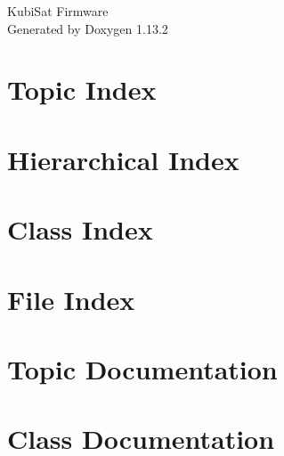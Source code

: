 \documentclass[twoside]{book}
\newcommand{\+}{\discretionary{\mbox{\scriptsize$\hookleftarrow$}}{}{}}
\newcommand{\clearemptydoublepage}{%
    \newpage{\pagestyle{empty}\cleardoublepage}%
  }
\begin{document}
  \raggedbottom
    \hypersetup{pageanchor=false,
                bookmarksnumbered=true,
                pdfencoding=unicode
               }
  \begin{titlepage}
  \vspace*{7cm}
  \begin{center}%
  {\Large Kubi\+Sat Firmware}\\
  \vspace*{1cm}
  {\large Generated by Doxygen 1.13.2}\\
  \end{center}
  \end{titlepage}
  \clearemptydoublepage
  \tableofcontents
  \clearemptydoublepage
  \hypersetup{pageanchor=true}

\chapter{Topic Index}

\chapter{Hierarchical Index}

\chapter{Class Index}

\chapter{File Index}

\chapter{Topic Documentation}






\chapter{Class Documentation}

























\end{document}
